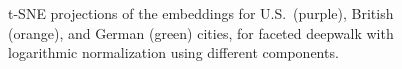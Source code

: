 \begin{figure}[t]
\caption{t-SNE projections of the embeddings for U.S.\ (purple), British (orange), and German (green) cities, for faceted deepwalk with logarithmic normalization using different components.}
\label{fig:clust_fdeepwalk}
\end{figure}
